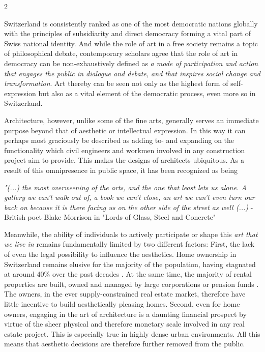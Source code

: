 \documentclass{article}
\begin{document}
\begin{multicols}{2}

Switzerland is consistently ranked as one of the most democratic nations globally \cite{noauthor_economist_2023} with the principles of subsidiarity and direct democracy forming a vital part of Swiss national identity. And while the role of art in a free society remains a topic of philosophical debate, contemporary scholars agree that the role of art in democracy can be non-exhaustively defined as \textit{a mode of participation and action that engages the public in dialogue and debate, and that inspires social change and transformation}. Art thereby can be seen not only as the highest form of self-expression but also as a vital element of the democratic process, even more so in Switzerland.

Architecture, however, unlike some of the fine arts, generally serves an immediate purpose beyond that of aesthetic or intellectual expression. In this way it can perhaps most graciously be described as adding to- and expanding on the functionality which civil engineers and workmen involved in any construction project aim to provide. This makes the designs of architects ubiquitous. As a result of this omnipresence in public space, it has been recognized as being

\textit{"(...) the most overweening of the arts, and the one that least lets us alone. A gallery we can't walk out of, a book we can't close, an art we can't even turn our back on because it is there facing us on the other side of the street as well (...)} - British poet Blake Morrison in "Lords of Glass, Steel and Concrete" \cite{morrison_lords_1982}

Meanwhile, the ability of individuals to actively participate or shape this \textit{art that we live in} \cite{hughes_shock_1980} remains fundamentally limited by two different factors: First, the lack of even the legal possibility to influence the aesthetics. Home ownership in Switzerland remains elusive for the majority of the population, having stagnated at around 40\% over the past decades \cite{noauthor_home_2022}. At the same time, the majority of rental properties are built, owned and managed by large corporations or pension funds \cite{noauthor_wem_nodate}. The owners, in the ever supply-constrained real estate market, therefore have little incentive to build aesthetically pleasing homes. Second, even for home owners, engaging in the art of architecture is a daunting financial prospect by virtue of the sheer physical and therefore monetary scale involved in any real estate project. This is especially true in highly dense urban environments. All this means that aesthetic decisions are therefore further removed from the public.


\end{multicols}
\end{document}
